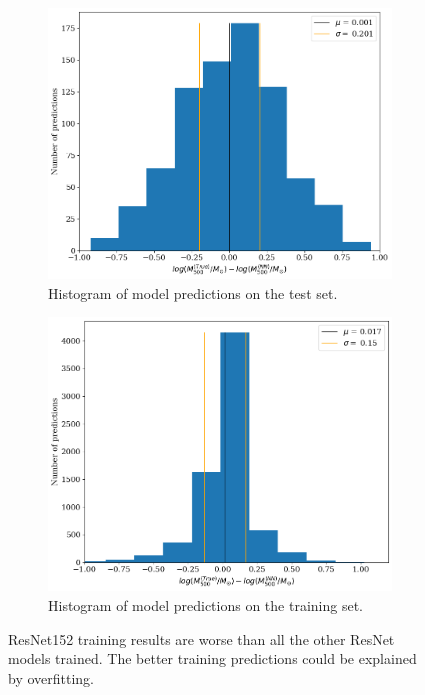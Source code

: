 \begin{figure}[H]
\begin{subfigure}{.46\textwidth}
  \centering
  \includegraphics[width=\linewidth]{images/Chapter4/Res152/res152_test_hist.png}
  \caption{Histogram of model predictions on the test set.}
  \label{fig:best_perf_resnet152_c}
\end{subfigure}%
\hspace{.6em}
\begin{subfigure}{.46\textwidth}
  \centering
  \includegraphics[width=\linewidth]{images/Chapter4/Res152/res152_train_hist.png}
  \caption{Histogram of model predictions on the training set.}
  \label{fig:best_perf_resnet152_d}
\end{subfigure}
\caption{ResNet152 training results are worse than all the other ResNet models trained. The better training predictions could be explained by overfitting.} 
\label{fig:best_perf_resnet152}
\end{figure}